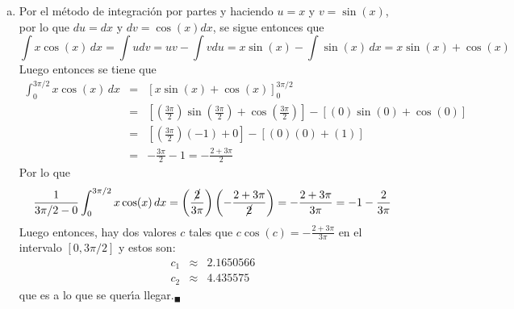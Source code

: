 \begin{solucion}
\begin{enumerate}[(a)]
  \item Por el m\'etodo de integraci\'on por partes y haciendo $u = x$ y $v = \sin(x)$, por lo que $du = dx$ y $dv = \cos(x) dx$, se sigue entonces que
  \begin{equation*}
   \int x\cos(x)\, dx = \int udv = uv - \int vdu = x\sin(x) - \int \sin(x) \, dx = x\sin(x) + \cos(x)
  \end{equation*}
  Luego entonces se tiene que
  \begin{eqnarray*}
   \int_{0}^{3\pi/2} x\cos(x) \, dx & = & \left[ x\sin(x) + \cos(x) \right]_{0}^{3\pi/2} \\
   & = & \left[ \left( \frac{3\pi}{2} \right)\sin\left( \frac{3\pi}{2} \right) + \cos\left( \frac{3\pi}{2} \right) \right] - \left[ (0)\sin(0) + \cos(0) \right] \\
   & = & \left[ \left( \frac{3\pi}{2} \right)(-1)+0\right]- \left[(0)(0) + (1) \right] \\
   & = & -\frac{3\pi}{2} - 1 = - \frac{2 + 3\pi}{2}
  \end{eqnarray*}
  Por lo que
  \begin{equation*}
   \frac{1}{3\pi/2 - 0} \int_{0}^{3\pi/2} x\cos(x) \, dx = \left( \frac{\cancel{2}}{3\pi} \right) \left( -\frac{2+3\pi}{\cancel{2}}  \right) = - \frac{2+3\pi}{3\pi} = -1- \frac{2}{3\pi}
  \end{equation*}
  Luego entonces, hay dos valores $c$ tales que $c\cos(c) = -\frac{2+3\pi}{3\pi}$ en el intervalo $[0,3\pi/2]$ y estos son:
  \begin{eqnarray*}
   c_1 & \approx & 2.1650566 \\
   c_2 & \approx & 4.435575
  \end{eqnarray*}
  que es a lo que se quer\'{\i}a llegar.${}_{\blacksquare}$
 \end{enumerate}
\end{solucion}
